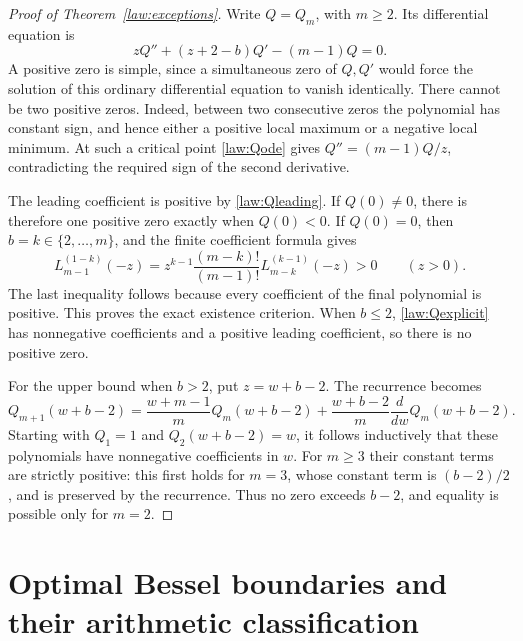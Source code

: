\documentclass[11pt,a4paper]{article}
\theoremstyle{definition}
\theoremstyle{remark}
\numberwithin{equation}{section}
\begin{document}
\begin{proof}[Proof of Theorem~\ref{law:exceptions}]
Write $Q=Q_m$, with $m\geq2$. Its differential equation is
\begin{equation}\label{law:Qode}
 zQ''+(z+2-b)Q'-(m-1)Q=0.
\end{equation}
A positive zero is simple, since a simultaneous zero of $Q,Q'$ would
force the solution of this ordinary differential equation to vanish
identically. There cannot be two positive zeros. Indeed, between two
consecutive zeros the polynomial has constant sign, and hence either
a positive local maximum or a negative local minimum. At such a
critical point \eqref{law:Qode} gives $Q''=(m-1)Q/z$, contradicting the
required sign of the second derivative.

The leading coefficient is positive by \eqref{law:Qleading}. If
$Q(0)\ne0$, there is therefore one positive zero exactly when
$Q(0)<0$. If $Q(0)=0$, then $b=k\in\{2,\ldots,m\}$, and the
finite coefficient formula gives
\begin{equation}\label{law:Lagfactor}
 L_{m-1}^{(1-k)}(-z)
 =z^{k-1}\frac{(m-k)!}{(m-1)!}L_{m-k}^{(k-1)}(-z)>0
 \qquad(z>0).
\end{equation}
The last inequality follows because every coefficient of the final
polynomial is positive. This proves the exact existence criterion.
When $b\leq2$, \eqref{law:Qexplicit} has nonnegative coefficients and a
positive leading coefficient, so there is no positive zero.

For the upper bound when $b>2$, put $z=w+b-2$. The recurrence becomes
\[
 Q_{m+1}(w+b-2)
 =\frac{w+m-1}{m}Q_m(w+b-2)
 +\frac{w+b-2}{m}\frac d{dw}Q_m(w+b-2).
\]
Starting with $Q_1=1$ and $Q_2(w+b-2)=w$, it follows inductively
that these polynomials have nonnegative coefficients in $w$.
For $m\geq3$ their constant terms are strictly positive: this first
holds for $m=3$, whose constant term is $(b-2)/2$, and is preserved
by the recurrence. Thus no zero exceeds $b-2$, and equality is
possible only for $m=2$.
\end{proof}

\section{Optimal Bessel boundaries and their arithmetic classification}
\label{law:boundarysection}
\end{document}
